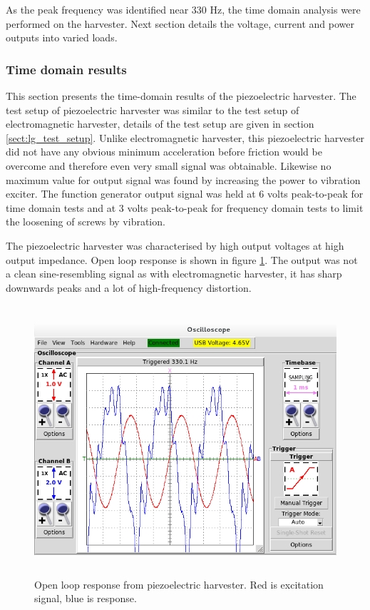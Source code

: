 As the peak frequency was identified near 330 Hz, the time domain analysis were performed on the harvester. Next section details the voltage, current and power outputs into varied loads.

\subsubsection{Time domain results}
This section presents the time-domain results of the piezoelectric harvester. The test setup of piezoelectric harvester was similar to the test setup of electromagnetic harvester, details of the test setup are given in section \ref{sect:lg_test_setup}. Unlike electromagnetic harvester, this piezoelectric harvester did not have any obvious minimum acceleration before friction would be overcome and therefore even very small signal was obtainable. Likewise no maximum value for output signal was found by increasing the power to vibration exciter. The function generator output signal was held at 6 volts peak-to-peak for time domain tests and at 3 volts peak-to-peak for frequency domain tests to limit the loosening of screws by vibration.

The piezoelectric harvester was characterised by high output voltages at high output impedance. Open loop response is shown in figure \ref{fig:piezo_td_open}. The output was not a clean sine-resembling signal as with electromagnetic harvester, it has sharp downwards peaks and a lot of high-frequency distortion.

\begin{figure}[htb]
\begin{center}
\includegraphics[height=10cm]{images/own_measurement/generator_shaker/piezo_td_open_330hz_2_2.png}
\end{center}
\caption{\label{fig:piezo_td_open} Open loop response from piezoelectric harvester. Red is excitation signal, blue is response.}
\end{figure}

